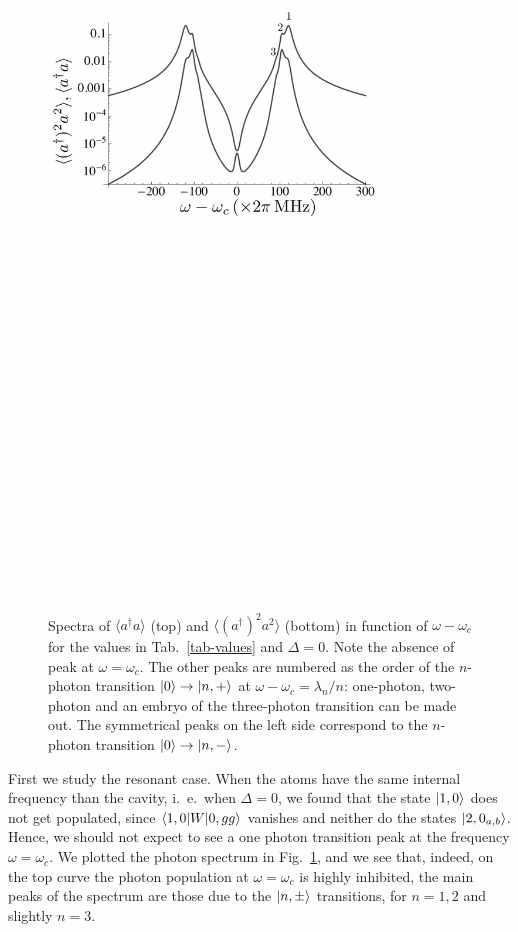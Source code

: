 \begin{figure}
\center
\includegraphics[width=0.75 \textwidth]{Images/chap5/spectrum0.pdf}
\caption[$\langle a^\dagger a \rangle$ and $\langle (a^\dagger)^2 a^2 \rangle$  in function of  $\omega-\omega_c$]{Spectra of $\langle a^\dagger a \rangle$ (top) and $\langle (a^\dagger)^2 a^2 \rangle$ (bottom) in function of  $\omega-\omega_c$ for the values in Tab.~\ref{tab-values} and $\Delta=0$. Note the absence of peak at $\omega=\omega_c$. The other peaks are numbered as the order of the $n$-photon transition $| 0 \rangle \rightarrow | n,+ \rangle$ at $\omega-\omega_c=\lambda_n/n$: one-photon, two-photon and an embryo of the three-photon transition can be made out. The symmetrical peaks on the left side correspond to the $n$-photon transition $| 0 \rangle \rightarrow | n,- \rangle$.}
\label{fig-spec0}
\end{figure}

First we study the resonant case. When the atoms have the same internal frequency than the cavity, i.~e.~when $\Delta=0$, we found that the state $| 1,0 \rangle$ does not get populated, since $\langle 1,0 | W | 0,gg \rangle$ vanishes and neither do the states $| 2,0_{a,b} \rangle$. Hence, we should not expect to see a one photon transition peak at the frequency $\omega=\omega_c$. We plotted the photon spectrum in Fig.~\ref{fig-spec0}, and we see that, indeed, on the top curve the photon population at $\omega=\omega_c$ is highly inhibited, the main peaks of the spectrum are those due to the $| n,\pm \rangle$ transitions, for $n=1, 2$ and slightly $n=3$. 

